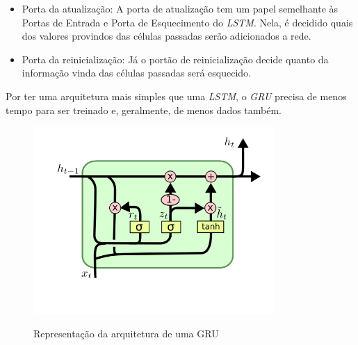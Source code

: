 \begin{itemize}
    \item Porta da atualização: A porta de atualização tem um papel semelhante às Portas de Entrada e Porta de Esquecimento do \textit{\acrshort{LSTM}}. Nela, é decidido quais dos valores provindos das células passadas serão adicionados a rede.
    \item Porta da reinicialização: Já o portão de reinicialização decide quanto da informação vinda das células passadas será esquecido.
\end{itemize}

Por ter uma arquitetura mais simples que uma \textit{\acrshort{LSTM}}, o \textit{\acrshort{GRU}} precisa de menos tempo para ser treinado e, geralmente, de menos dados também.

\begin{figure}[htbp]
    \centering
    \includegraphics[scale=1.0]{monography/img/models/GRU.png}
    \label{figure:gru}
    \caption[Representação da arquitetura de uma GRU]{Representação da arquitetura de uma GRU\footnotemark}
\end{figure}